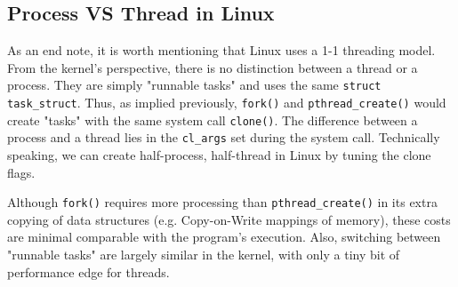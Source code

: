 \documentclass[12pt]{article}
\begin{document}
\subsection{Process VS Thread in Linux}

As an end note, it is worth mentioning that Linux uses a 1-1 threading model. From the kernel's perspective, there is no distinction between a thread or a process. They are simply "runnable tasks" and uses the same \texttt{struct task\_struct}. Thus, as implied previously, \texttt{fork()} and \texttt{pthread\_create()} would create "tasks" with the same system call \texttt{clone()}. The difference between a process and a thread lies in the \texttt{cl\_args} set during the system call. Technically speaking, we can create half-process, half-thread in Linux by tuning the clone flags.

Although \texttt{fork()} requires more processing than \texttt{pthread\_create()} in its extra copying of data structures (e.g. Copy-on-Write mappings of memory), these costs are minimal comparable with the program's execution. Also, switching between "runnable tasks" are largely similar in the kernel, with only a tiny bit of performance edge for threads. 
\end{document}
